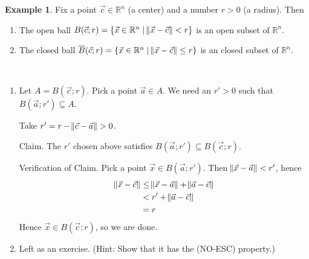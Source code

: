 \documentclass[11pt]{article}
\makeatletter
\theoremstyle{definition}
\newtheorem{exmp}[thm]{Example}
\newcommand{\R}{\ensuremath{\mathbb{R}}}
\newenvironment{pf}[1][\proofname]{\par
  \pushQED{\qed}%
  \normalfont \topsep0\p@\relax
  \trivlist
  \item[\hskip\labelsep\itshape
  #1\@addpunct{.}]\ignorespaces
}{%
  \popQED\endtrivlist\@endpefalse
}
\makeatother
\begin{document}
\begin{exmp}
Fix a point $\vec{c} \in \R^n$ (a center) and a number $r > 0$ (a radius). Then \vspace{-1.5ex}
\begin{enumerate}[(1)]
\item The open ball $B(\vec{c}; r) = \{\vec{x} \in \R^n \mid \norm{\vec{x} - \vec{c}} < r\}$ is an open subset of $\R^n$.
\item The closed ball $\overline{B}(\vec{c}; r) = \{\vec{x} \in \R^n \mid \norm{\vec{x} - \vec{c}} \leq r\}$ is an closed subset of $\R^n$.
\end{enumerate}
\end{exmp}
\begin{pf}~ \vspace{-1.5ex}

\begin{enumerate}[(1)]
\item Let $A = B(\vec{c}; r)$. Pick a point $\vec{a} \in A$. We need an $r' > 0$ such that $B(\vec{a}; r') \subseteq A$. 

Take $r' = r - \norm{\vec{c} - \vec{a}} > 0$. 

{\sc Claim.} The $r'$ chosen above satisfies $B(\vec{a}; r') \subseteq B(\vec{c}; r)$. 

{\sc Verification of Claim.} Pick a point $\vec{x} \in B(\vec{a}; r')$. Then $\norm{\vec{x} - \vec{a}} < r'$, hence
\begin{align*}
    \norm{\vec{x} - \vec{c}} &\leq \norm{\vec{x} - \vec{a}} + \norm{\vec{a} - \vec{c}} \\
    &< r' + \norm{\vec{a} - \vec{c}} \\
    &= r
\end{align*}
Hence $\vec{x} \in B(\vec{c}; r)$, so we are done.

\item Left as an exercise. (Hint: Show that it has the (NO-ESC) property.)
\end{enumerate}
\vspace{-1.1cm}
\end{pf}
\end{document}
